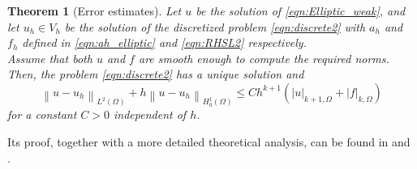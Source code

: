 \documentclass[10pt]{article}
\newcommand{\norm}[2]{\left\lVert#1\right\rVert_{#2}}
\newtheorem{theorem}{Theorem}
\begin{document}
\begin{theorem}[Error estimates]
	Let $u$ be the solution of \eqref{eqn:Elliptic_weak}, and let $u_h \in V_h$ be the solution of the discretized problem \eqref{eqn:discrete2} with $a_h$ and $f_h$ defined in \eqref{eqn:ah_elliptic} and \eqref{eqn:RHSL2} respectively. \\
	Assume that both $u$ and $f$ are smooth enough to compute the required norms. Then, the problem \eqref{eqn:discrete2} has a unique solution and
	$$\norm{u-u_h}{L^2(\Omega)}+h\norm{u-u_h}{H_0^1(\Omega)} \leq C h^{k+1} (|u|_{k+1,\Omega}+|f|_{k,\Omega})$$ for a constant $C>0$ independent of $h$.
\end{theorem}
Its proof, together with a more detailed theoretical analysis, can be found in \cite{General} and \cite{GeneralOnline}.

\newpage
\end{document}

